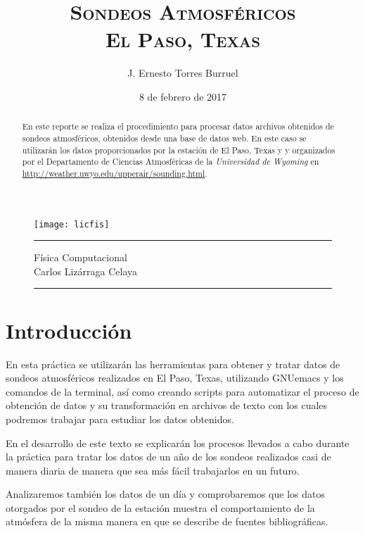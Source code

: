 \documentclass[12pt]{article}
\title{\huge \textbf{\textsc{Sondeos Atmosféricos\\ El Paso, Texas}}}%
\author{J. Ernesto Torres Burruel}
\date{8 de febrero de 2017}
\begin{document}
\begin{titlepage}%

\begin{figure}[h!]
    \centering
    \texttt{[image: licfis]}
    \\[2 cm]
    \hrule
    \maketitle
    {\Large Física Computacional\\Carlos Lizárraga Celaya}
    \bigskip
    \hrule
    \thispagestyle{empty}
\end{figure}
 \begin{abstract}
    En este reporte se realiza el procedimiento para procesar datos archivos obtenidos de sondeos atmosféricos, obtenidos desde una base de datos web. En este caso se utilizarán los datos proporcionados por la estación de El Paso, Texas y y organizados por el Departamento de Ciencias Atmosféricas de la \textit{Universidad de Wyoming} en \url{http://weather.uwyo.edu/upperair/sounding.html}.
   
    \end{abstract} 

\end{titlepage}

\newpage

\tableofcontents
\setcounter{page}{2}
\newpage

\section{Introducción}
En esta práctica se utilizarán las herramientas para obtener y tratar datos de sondeos atmosféricos realizados en El Paso, Texas, utilizando GNUemacs y los comandos de la terminal, así como creando scripts para automatizar el proceso de obtención de datos y su transformación en archivos de texto con los cuales podremos trabajar para estudiar los datos obtenidos.

En el desarrollo de este texto se explicarán los procesos llevados a cabo durante la práctica para tratar los datos de un año de los sondeos realizados casi de manera diaria de manera que sea más fácil trabajarlos en un futuro.

Analizaremos también los datos de un día y comprobaremos que los datos otorgados por el sondeo de la estación muestra el comportamiento de la atmósfera de la misma manera en que se describe de fuentes bibliográficas.
\end{document}
